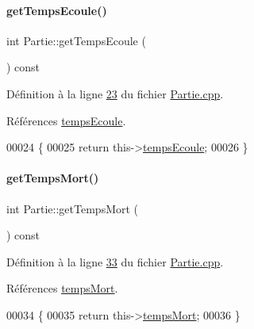 \paragraph{\texorpdfstring{get\+Temps\+Ecoule()}{getTempsEcoule()}}
{\footnotesize\ttfamily int Partie\+::get\+Temps\+Ecoule (\begin{DoxyParamCaption}{ }\end{DoxyParamCaption}) const}



Définition à la ligne \hyperlink{_partie_8cpp_source_l00023}{23} du fichier \hyperlink{_partie_8cpp_source}{Partie.\+cpp}.



Références \hyperlink{_partie_8h_source_l00020}{temps\+Ecoule}.


\begin{DoxyCode}
00024 \{
00025     \textcolor{keywordflow}{return} this->\hyperlink{class_partie_a58664212ddb4954a59298f1de8256477}{tempsEcoule};
00026 \}
\end{DoxyCode}
\mbox{\label{class_partie_ad78c6daffd7a676ce6c0a8e511991a75}} 
\paragraph{\texorpdfstring{get\+Temps\+Mort()}{getTempsMort()}}
{\footnotesize\ttfamily int Partie\+::get\+Temps\+Mort (\begin{DoxyParamCaption}{ }\end{DoxyParamCaption}) const}



Définition à la ligne \hyperlink{_partie_8cpp_source_l00033}{33} du fichier \hyperlink{_partie_8cpp_source}{Partie.\+cpp}.



Références \hyperlink{_partie_8h_source_l00021}{temps\+Mort}.


\begin{DoxyCode}
00034 \{
00035     \textcolor{keywordflow}{return} this->\hyperlink{class_partie_a55a5e6e0b757d74fa9aceefa7228ead9}{tempsMort};
00036 \}
\end{DoxyCode}
\mbox{\label{class_partie_a4c9c799ba4057c15c0600bdf8b7f296f}} 
